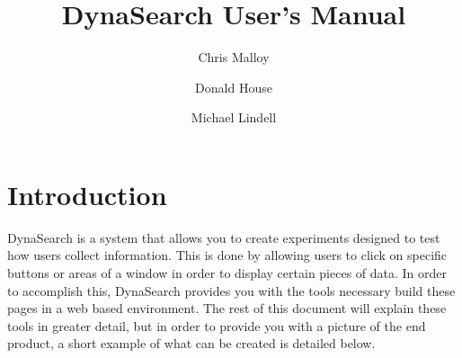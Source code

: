 \documentclass[article]{ij4uq}              %
\begin{document}
\title{DynaSearch User's Manual}
\titlehead{Hurricane prediction visualization}


\author[1]{Chris Malloy}
\author[1]{Donald House}
\author[2]{Michael Lindell}
\address[1]{ School of Computing, 100 McAdams Hall, Clemson University, Clemson, SC 29634-0974, USA}
\address[2]{Hazard Reduction \& Recovery Center, College of Architecture, Texas A\&M University, College Station, TX 77843-3137, USA}






\dataO{\mydate\today}
\dataF{\mydate\today}

\abstract{
}




\maketitle




\section{Introduction}

DynaSearch is a system that allows you to create experiments designed to test how users collect information. This is done by allowing users to click on specific buttons or areas of a window in order to display certain pieces of data. In order to accomplish this, DynaSearch provides you with the tools necessary build these pages in a web based environment. The rest of this document will explain these tools in greater detail, but in order to provide you with a picture of the end product, a short example of what can be created is detailed below. 
\end{document}
